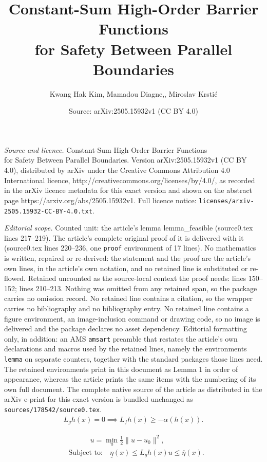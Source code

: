 \documentclass[10pt,a4paper]{amsart}
\title{Constant-Sum High-Order Barrier Functions\\ for Safety Between Parallel Boundaries}
\author{Kwang Hak Kim, Mamadou Diagne,, Miroslav Krsti\'c}
\date{Source: arXiv:2505.15932v1 (CC BY 4.0)}
\begin{document}
\maketitle

\noindent\emph{Source and licence.} Constant-Sum High-Order Barrier Functions\\ for Safety Between Parallel Boundaries. Version arXiv:2505.15932v1 (CC BY 4.0), distributed by arXiv under the Creative Commons Attribution 4.0 International licence, http://creativecommons.org/licenses/by/4.0/, as recorded in the arXiv licence metadata for this exact version and shown on the abstract page https://arxiv.org/abs/2505.15932v1. Full licence notice: \texttt{licenses/arxiv-2505.15932-CC-BY-4.0.txt}.\par\smallskip

\noindent\textit{Editorial scope.} Counted unit: the article's lemma lemma\_feasible (source0.tex lines 217--219). The article's complete original proof of it is delivered with it (source0.tex lines 220--236, one \texttt{proof} environment of 17 lines). No mathematics is written, repaired or re-derived: the statement and the proof are the article's own lines, in the article's own notation, and no retained line is substituted or re-flowed.  Retained uncounted as the source-local context the proof needs: lines 150--152; lines 210--213.  Nothing was omitted from any retained span, so the package carries no omission record.  No retained line contains a citation, so the wrapper carries no bibliography and no bibliography entry.  No retained line contains a figure environment, an image-inclusion command or drawing code, so no image is delivered and the package declares no asset dependency.  Editorial formatting only, in addition: an AMS \texttt{amsart} preamble that restates the article's own declarations and macros used by the retained lines, namely the environments \texttt{lemma} on separate counters, together with the standard packages those lines need.  The retained environments print in this document as Lemma 1 in order of appearance, whereas the article prints the same items with the numbering of its own full document.  The complete native source of the article as distributed in the arXiv e-print for this exact version is bundled unchanged as \texttt{sources/178542/source0.tex}.
\begin{align}
    L_gh(x) = 0 \implies L_fh(x) \geq -\alpha(h(x)).\label{cbf_Lgh_cond}
\end{align}

\begin{align}
    &\qquad \quad u = \min_{u} \frac{1}{2}\| u - u_0 \|^2, \label{qp_1}\\
    &\text{Subject to:} \quad  \underline{\eta}(x) \leq  L_gh(x) u \leq \overline{\eta}(x)\label{qp_2}.
\end{align}
\end{document}
